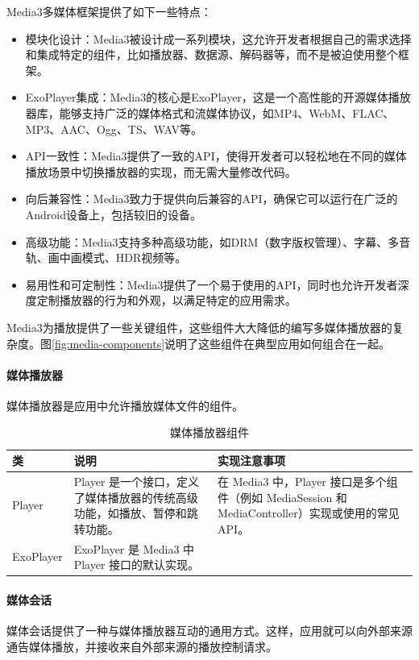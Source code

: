 \documentclass[main.tex]{subfiles}
\begin{document}
Media3多媒体框架提供了如下一些特点：
\begin{itemize}
    \item 模块化设计：Media3被设计成一系列模块，这允许开发者根据自己的需求选择和集成特定的组件，比如播放器、数据源、解码器等，而不是被迫使用整个框架。
    \item ExoPlayer集成：Media3的核心是ExoPlayer，这是一个高性能的开源媒体播放器库，能够支持广泛的媒体格式和流媒体协议，如MP4、WebM、FLAC、MP3、AAC、Ogg、TS、WAV等。
    \item API一致性：Media3提供了一致的API，使得开发者可以轻松地在不同的媒体播放场景中切换播放器的实现，而无需大量修改代码。
    \item 向后兼容性：Media3致力于提供向后兼容的API，确保它可以运行在广泛的Android设备上，包括较旧的设备。
    \item 高级功能：Media3支持多种高级功能，如DRM（数字版权管理）、字幕、多音轨、画中画模式、HDR视频等。
    \item 易用性和可定制性：Media3提供了一个易于使用的API，同时也允许开发者深度定制播放器的行为和外观，以满足特定的应用需求。
\end{itemize}

Media3为播放提供了一些关键组件，这些组件大大降低的编写多媒体播放器的复杂度。图\ref{fig:media-components}说明了这些组件在典型应用如何组合在一起。

\paragraph{媒体播放器} 媒体播放器是应用中允许播放媒体文件的组件。

\begin{table}[htbp]
    \centering
    \begin{tabularx}{\textwidth}{|l|X|X|}
    \hline
    类 & 说明 & 实现注意事项 \\
    \hline
    Player & Player 是一个接口，定义了媒体播放器的传统高级功能，如播放、暂停和跳转功能。& 在 Media3 中，Player 接口是多个组件（例如 MediaSession 和 MediaController）实现或使用的常见 API。\\
    \hline
    ExoPlayer & ExoPlayer 是 Media3 中 Player 接口的默认实现。 & \\
    \hline
    \end{tabularx}
    \caption{媒体播放器组件}
    \label{tab:my_label}
\end{table}

\paragraph{媒体会话} 媒体会话提供了一种与媒体播放器互动的通用方式。这样，应用就可以向外部来源通告媒体播放，并接收来自外部来源的播放控制请求。
\end{document}

